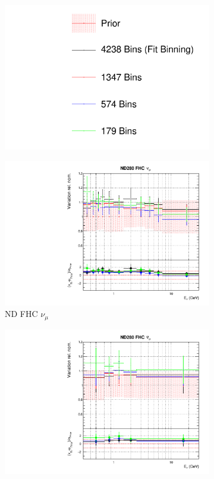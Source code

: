 \begin{figure}[t]
\centering
\begin{subfigure}{0.95\textwidth}
  \centering
  \includegraphics[width=0.24\linewidth]{figs/detcovbin_leg}
\end{subfigure}
\begin{subfigure}{0.24\textwidth}
  \centering
  \includegraphics[width=0.95\linewidth]{figs/detcovbinflux_0}
  \caption{ND FHC $\nu_{\mu}$}
\end{subfigure}
\begin{subfigure}{0.24\textwidth}
  \centering
  \includegraphics[width=0.95\linewidth]{figs/detcovbinflux_1}

\end{subfigure}
\end{figure}
